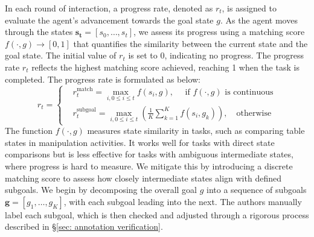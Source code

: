 In each round of interaction, a progress rate, denoted as $r_t$, is assigned to evaluate the agent's advancement towards the goal state $g$. As the agent moves through the states $\mathbf{s_t}=[s_0, \dots, s_t]$, we assess its progress using a matching score $f(\cdot,g)\rightarrow [0,1]$ that quantifies the similarity between the current state and the goal state. The initial value of $r_t$ is set to 0, indicating no progress. The progress rate $r_t$ reflects the highest matching score achieved, reaching 1 when the task is completed. The progress rate is formulated as below: 
\begin{equation}
r_t = \left\{
\begin{aligned}
    &r_t^{\text{match}} = \max_{i, 0\leq i \leq t} f(s_i, g), \quad \, \, \text{if } f(\cdot, g)  \text{ is continuous} \\
    &r_{t}^{\text{subgoal}} = \max_{i, 0\leq i \leq t}\left(\frac{1}{K}\sum_{k=1}^Kf(s_i,g_k)\right), \quad \text{otherwise}
\end{aligned}
\right. 
\label{eq: progress rate}
\end{equation}
The function $f(\cdot, g)$ measures state similarity in tasks, such as comparing table states in manipulation activities. It works well for tasks with direct state comparisons but is less effective for tasks with ambiguous intermediate states, where progress is hard to measure. We mitigate this by introducing a discrete matching score to assess how closely intermediate states align with defined subgoals.
We begin by decomposing the overall goal $g$ into a sequence of subgoals $\mathbf{g} = [g_1, \dots, g_K]$, with each subgoal leading into the next. The authors manually label each subgoal, which is then checked and adjusted through a rigorous process described in \S\ref{sec: annotation verification}.
